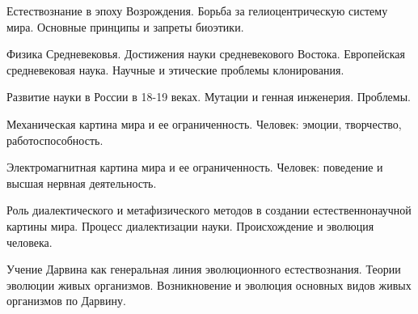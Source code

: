 \documentclass[
	14pt,
	a4paper,
	]
	{scrartcl}
\begin{document}
\vfill
\z Естествознание в эпоху Возрождения. Борьба за гелиоцентрическую систему мира.
 \vfill
\z Основные принципы и запреты биоэтики.
 \vfill

\vfill

\newpage


\shapk
{}
\setcounter{zad}{0}

\vfill
\z Физика Средневековья. Достижения науки средневекового Востока. Европейская средневековая наука.
 \vfill
\z Научные и этические проблемы клонирования.
 \vfill

\vfill

\newpage


\shapk
{}
\setcounter{zad}{0}

\vfill
\z Развитие науки в России в 18-19 веках.
 \vfill
\z Мутации и генная инженерия. Проблемы.
 \vfill

\vfill

\newpage


\shapk
{}
\setcounter{zad}{0}

\vfill
\z Механическая картина мира и ее ограниченность.
 \vfill
\z Человек: эмоции, творчество, работоспособность.
 \vfill

\vfill

\newpage


\shapk
{}
\setcounter{zad}{0}

\vfill
\z Электромагнитная картина мира и ее ограниченность.
 \vfill
\z Человек: поведение и высшая нервная деятельность.
 \vfill

\vfill

\newpage


\shapk
{}
\setcounter{zad}{0}

\vfill
\z Роль диалектического и метафизического методов в создании естественнонаучной картины мира. Процесс диалектизации науки.
 \vfill
\z Происхождение и эволюция человека.
 \vfill

\vfill

\newpage


\shapk
{}
\setcounter{zad}{0}

\vfill
\z Учение Дарвина как генеральная линия эволюционного естествознания.
 \vfill
\z Теории эволюции живых организмов. Возникновение и эволюция основных видов живых организмов по Дарвину.
 \vfill

\vfill

\newpage
\end{document}
